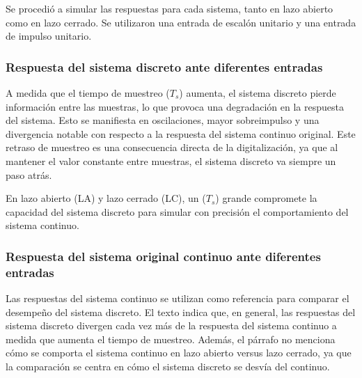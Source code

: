 \documentclass[journal]{IEEEtran}
\begin{document}
Se procedió a simular las respuestas para cada sistema, tanto en lazo abierto como en lazo cerrado. Se utilizaron una entrada de escalón unitario y una entrada de impulso unitario.


\subsubsection{\textbf{Respuesta del sistema discreto ante diferentes entradas}}

A medida que el tiempo de muestreo ($T_s$) aumenta, el sistema discreto pierde información entre las muestras, lo que provoca una degradación en la respuesta del sistema. Esto se manifiesta en oscilaciones, mayor sobreimpulso y una divergencia notable con respecto a la respuesta del sistema continuo original.  Este retraso de muestreo es una consecuencia directa de la digitalización, ya que al mantener el valor constante entre muestras, el sistema discreto va siempre un paso atrás.

En lazo abierto (LA) y lazo cerrado (LC), un ($T_s$) grande compromete la capacidad del sistema discreto para simular con precisión el comportamiento del sistema continuo.

\subsubsection{\textbf{Respuesta del sistema original continuo ante diferentes entradas}}

Las respuestas del sistema continuo se utilizan como referencia para comparar el desempeño del sistema discreto. El texto indica que, en general, las respuestas del sistema discreto divergen cada vez más de la respuesta del sistema continuo a medida que aumenta el tiempo de muestreo.  Además, el párrafo no menciona cómo se comporta el sistema continuo en lazo abierto versus lazo cerrado, ya que la comparación se centra en cómo el sistema discreto se desvía del continuo.
\end{document}
